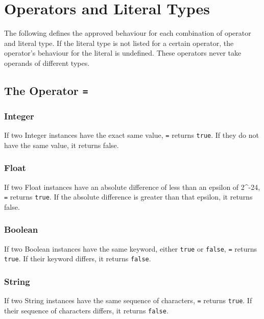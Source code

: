 \section{Operators and Literal Types}
The following defines the approved behaviour for each combination of operator and literal type. If the literal type is not listed for a certain operator, the operator's behaviour for the literal is undefined. These operators never take operands of different types.
\subsection{The Operator \verb!=!}
\subsubsection{Integer}
If two Integer instances have the exact same value, \verb!=! returns \verb!true!. If they do not have the same value, it returns false.
\subsubsection{Float}
If two Float instances have an absolute difference of less than an epsilon of 2^{-24}, \verb!=! returns \verb!true!. If the absolute difference is greater than that epsilon, it returns false.
\subsubsection{Boolean}
If two Boolean instances have the same keyword, either \verb!true! or \verb!false!, \verb!=! returns \verb!true!. If their keyword differs, it returns \verb!false!.
\subsubsection{String}
If two String instances have the same sequence of characters, \verb!=! returns \verb!true!. If their sequence of characters differs, it returns \verb!false!.
